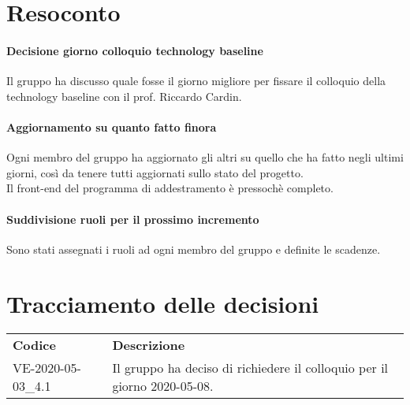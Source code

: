 \documentclass{article}
\begin{document}
\section{Resoconto}%
\label{resoconto}
\paragraph*{Decisione giorno colloquio technology baseline}
Il gruppo ha discusso quale fosse il giorno migliore per fissare il colloquio della technology baseline con il prof. Riccardo Cardin.
\paragraph*{Aggiornamento su quanto fatto finora}
Ogni membro del gruppo ha aggiornato gli altri su quello che ha fatto negli ultimi giorni, così da tenere tutti aggiornati sullo stato del progetto. \\
Il front-end del programma di addestramento è pressochè completo.
\paragraph*{Suddivisione ruoli per il prossimo incremento}
Sono stati assegnati i ruoli ad ogni membro del gruppo e definite le scadenze.


\section{Tracciamento delle decisioni}
\begin{table}[H]
  \centering
  \begin{tabular}{p{4cm}|p{12cm}}
    \rowcolor{lightgray}
    \textbf{Codice}  & \textbf{Descrizione}      \\
      VE-2020-05-03\_4.1 & Il gruppo ha deciso di richiedere il colloquio per il giorno 2020-05-08. \\
  \end{tabular}
\end{table}
\end{document}
